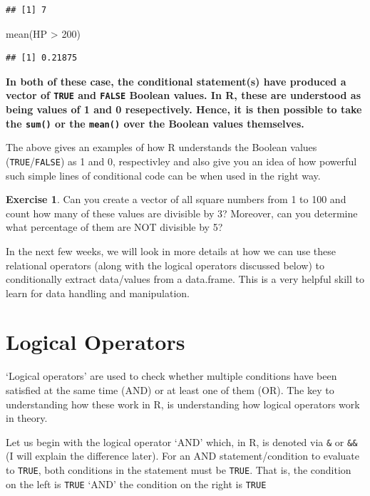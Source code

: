 \documentclass[
]{book}
\newenvironment{Shaded}{\begin{snugshade}}{\end{snugshade}}
\newcommand{\DecValTok}[1]{\textcolor[rgb]{0.00,0.00,0.81}{#1}}
\newcommand{\FunctionTok}[1]{\textcolor[rgb]{0.00,0.00,0.00}{#1}}
\newcommand{\NormalTok}[1]{#1}
\newcommand{\SpecialCharTok}[1]{\textcolor[rgb]{0.00,0.00,0.00}{#1}}
\theoremstyle{definition}
\theoremstyle{definition}
\theoremstyle{definition}
\newtheorem{exercise}{Exercise}[chapter]
\theoremstyle{definition}
\theoremstyle{remark}
\begin{document}
\begin{verbatim}
## [1] 7
\end{verbatim}

\begin{Shaded}
\begin{Highlighting}[]
\FunctionTok{mean}\NormalTok{(HP }\SpecialCharTok{\textgreater{}} \DecValTok{200}\NormalTok{) }
\end{Highlighting}
\end{Shaded}

\begin{verbatim}
## [1] 0.21875
\end{verbatim}

\textbf{In both of these case, the conditional statement(s) have produced a vector of \texttt{TRUE} and \texttt{FALSE} Boolean values. In R, these are understood as being values of 1 and 0 resepectively. Hence, it is then possible to take the \texttt{sum()} or the \texttt{mean()} over the Boolean values themselves.}

The above gives an examples of how R understands the Boolean values (\texttt{TRUE}/\texttt{FALSE}) as 1 and 0, respectivley and also give you an idea of how powerful such simple lines of conditional code can be when used in the right way.

\begin{exercise}
Can you create a vector of all square numbers from 1 to 100 and count how many of these values are divisible by 3? Moreover, can you determine what percentage of them are NOT divisible by 5?
\end{exercise}

In the next few weeks, we will look in more details at how we can use these relational operators (along with the logical operators discussed below) to conditionally extract data/values from a data.frame. This is a very helpful skill to learn for data handling and manipulation.

\hypertarget{logical-operators}{%
\section{Logical Operators}\label{logical-operators}}

`Logical operators' are used to check whether multiple conditions have been satisfied at the same time (AND) or at least one of them (OR). The key to understanding how these work in R, is understanding how logical operators work in theory.

Let us begin with the logical operator `AND' which, in R, is denoted via \texttt{\&} or \texttt{\&\&} (I will explain the difference later). For an AND statement/condition to evaluate to \texttt{TRUE}, both conditions in the statement must be \texttt{TRUE}. That is, the condition on the left is \texttt{TRUE} `AND' the condition on the right is \texttt{TRUE}
\end{document}

